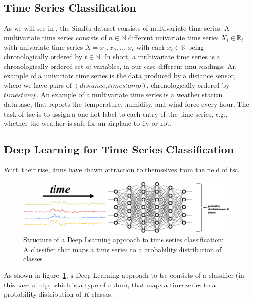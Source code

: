 \subsection{Time Series Classification}
As we will see in , the SimRa dataset consists of multivariate time series.
A multivariate time series consists of $n \in \mathbb{N}$ different univariate time series $X_{i} \in \mathbb{R}_{t}$ with univariate time series $X = x_{1}, x_{2},...,x_{t}$ with each $x_{i} \in \mathbb{R}$ being chronologically ordered by $t \in \mathbb{N}$.
In short, a multivariate time series is a chronologically ordered set of variables, in our case different \ac{imu} readings.
An example of a univariate time series is the data produced by a distance sensor, where we have pairs of $(distance,timestamp)$, chronologically ordered by $timestamp$.
An example of a multivariate time series is a weather station database, that reports the temperature, humidity, and wind force every hour.
The task of \ac{tsc} is to assign a one-hot label to each entry of the time series, e.g., whether the weather is safe for an airplane to fly or not. 

\subsection{Deep Learning for Time Series Classification}
With their rise, \acp{dnn} have drawn attraction to themselves from the field of \ac{tsc}.

\begin{figure}
    \center
    \includegraphics[width=\columnwidth]{fig/deep_learning_structure.pdf}
    \caption{Structure of a Deep Learning approach to time series classification: A classifier that maps a time series to a probability distribution of classes\cite{chen2021deep}}
    \label{fig:deep_learning_structure}
\end{figure}

As shown in figure~\ref{fig:deep_learning_structure}, a Deep Learning approach to \ac{tsc} consists of a classifier (in this case a \ac{mlp}, which is a type of a \ac{dnn}), that maps a time series to a probability distribution of $K$ classes.

